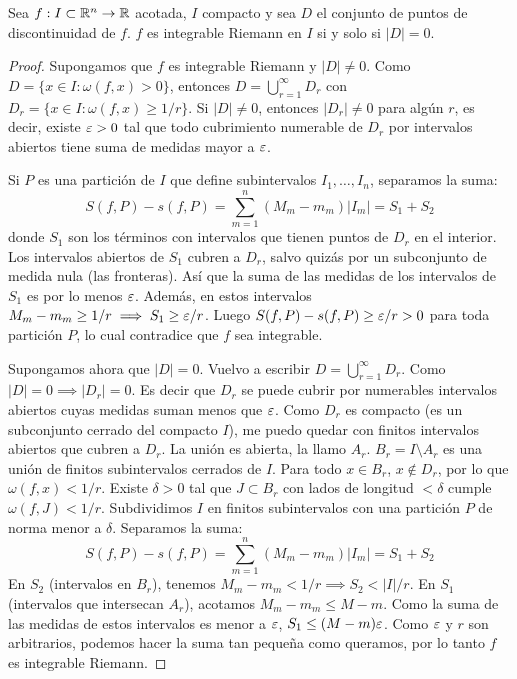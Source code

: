 \begin{theorem}
  Sea \(f: I \subset \mathbb{R}^n \to \mathbb{R}\) acotada, \(I\) compacto y sea \(D\) el conjunto de puntos de discontinuidad de \(f\). \(f\) es integrable Riemann en \(I\) si y solo si \(|D| = 0\).
\end{theorem}
\begin{proof}
  Supongamos que \(f\) es integrable Riemann y \(|D| \neq 0\). Como \(D = \{x \in I : \omega(f, x) > 0\}\), entonces \(D = \bigcup_{r=1}^\infty D_r\) con \(D_r = \{x \in I : \omega(f, x) \geq 1/r\}\).
  Si \(|D| \neq 0\), entonces \(|D_r| \neq 0\) para algún \(r\), es decir, existe \(\varepsilon > 0\) tal que todo cubrimiento numerable de \(D_r\) por intervalos abiertos tiene suma de medidas mayor a \(\varepsilon\).

  Si \(P\) es una partición de \(I\) que define subintervalos \(I_1, \dots, I_n\), separamos la suma:
  \[ S(f, P) - s(f, P) = \sum_{m=1}^n (M_m - m_m)|I_m| = S_1 + S_2 \]
  donde \(S_1\) son los términos con intervalos que tienen puntos de \(D_r\) en el interior.
  Los intervalos abiertos de \(S_1\) cubren a \(D_r\), salvo quizás por un subconjunto de medida nula (las fronteras). Así que la suma de las medidas de los intervalos de \(S_1\) es por lo menos \(\varepsilon\).
  Además, en estos intervalos \(M_m - m_m \geq 1/r \implies S_1 \geq \varepsilon/r\).
  Luego \(S(f, P) - s(f, P) \geq \varepsilon/r > 0\) para toda partición \(P\), lo cual contradice que \(f\) sea integrable.

  Supongamos ahora que \(|D| = 0\). Vuelvo a escribir \(D = \bigcup_{r=1}^\infty D_r\).
  Como \(|D| = 0 \implies |D_r| = 0\). Es decir que \(D_r\) se puede cubrir por numerables intervalos abiertos cuyas medidas suman menos que \(\varepsilon\).
  Como \(D_r\) es compacto (es un subconjunto cerrado del compacto \(I\)), me puedo quedar con finitos intervalos abiertos que cubren a \(D_r\). La unión es abierta, la llamo \(A_r\).
  \(B_r = I \setminus A_r\) es una unión de finitos subintervalos cerrados de \(I\).
  Para todo \(x \in B_r\), \(x \notin D_r\), por lo que \(\omega(f, x) < 1/r\).
  Existe \(\delta > 0\) tal que \(J \subset B_r\) con lados de longitud \(< \delta\) cumple \(\omega(f, J) < 1/r\).
  Subdividimos \(I\) en finitos subintervalos con una partición \(P\) de norma menor a \(\delta\).
  Separamos la suma:
  \[ S(f, P) - s(f, P) = \sum_{m=1}^n (M_m - m_m)|I_m| = S_1 + S_2 \]
  En \(S_2\) (intervalos en \(B_r\)), tenemos \(M_m - m_m < 1/r \implies S_2 < |I|/r\).
  En \(S_1\) (intervalos que intersecan \(A_r\)), acotamos \(M_m - m_m \leq M - m\). Como la suma de las medidas de estos intervalos es menor a \(\varepsilon\), \(S_1 \leq (M - m)\varepsilon\).
  Como \(\varepsilon\) y \(r\) son arbitrarios, podemos hacer la suma tan pequeña como queramos, por lo tanto \(f\) es integrable Riemann.
\end{proof}

